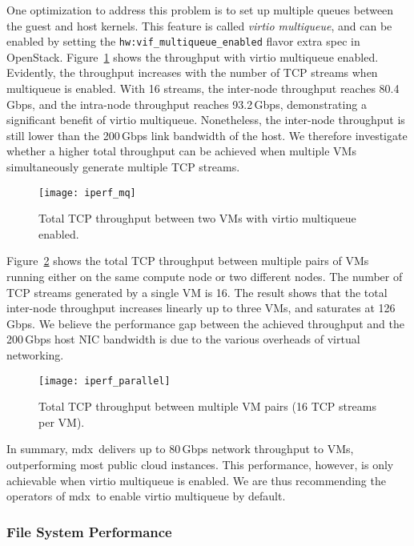 \documentclass[a4paper,twoside]{article}
\newcommand{\mdx}{mdx\,\uppercase\expandafter{\romannumeral 2\relax}}
\begin{document}
One optimization to address this problem is to set up multiple queues between the guest and
host kernels. This feature is called \emph{virtio multiqueue}, and can be enabled by setting the
\verb|hw:vif_multiqueue_enabled| flavor extra spec in OpenStack.
Figure~\ref{fig:iperf-mq} shows the throughput with virtio multiqueue enabled. Evidently, the
throughput increases with the number of TCP streams when multiqueue is enabled. With 16 streams, the
inter-node throughput reaches 80.4\,Gbps, and the intra-node throughput reaches 93.2\,Gbps,
demonstrating a significant benefit of virtio multiqueue. Nonetheless, the inter-node throughput is
still lower than the 200\,Gbps link bandwidth of the host. We therefore investigate whether a higher
total throughput can be achieved when multiple VMs simultaneously generate multiple TCP streams.

\begin{figure}
    \centering
    \texttt{[image: iperf\_mq]}%
    \caption{Total TCP throughput between two VMs with virtio multiqueue enabled.}\label{fig:iperf-mq}
\end{figure}

Figure~\ref{fig:iperf-parallel} shows the total TCP throughput between multiple pairs of VMs running
either on the same compute node or two different nodes. The number of TCP streams generated by a single VM
is 16. The result shows that the total inter-node throughput increases linearly up to three VMs, and
saturates at 126\,Gbps. We believe the performance gap between the achieved throughput and the
200\,Gbps host NIC bandwidth is due to the various overheads of virtual networking.

\begin{figure}
    \centering
    \texttt{[image: iperf\_parallel]}%
    \caption{Total TCP throughput between multiple VM pairs (16 TCP streams per VM).}\label{fig:iperf-parallel}
\end{figure}

In summary, \mdx{} delivers up to 80\,Gbps network throughput to VMs, outperforming most public
cloud instances. This performance, however, is only achievable when virtio multiqueue is enabled.
We are thus recommending the operators of \mdx{} to enable virtio multiqueue by default.

\subsubsection{File System Performance}
\end{document}
